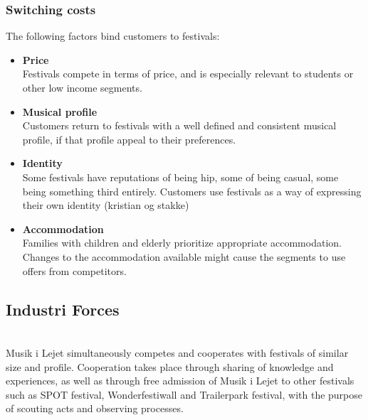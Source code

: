 \subsubsection{Switching costs}
The following factors bind customers to festivals:
\begin{itemize}
	\item \textbf{Price}\\
	Festivals compete in terms of price, and is especially relevant to students or other low income segments.
	\item \textbf{Musical profile}\\
	Customers return to festivals with a well defined and consistent musical profile, if that profile appeal to their preferences.
	\item \textbf{Identity}\\
	Some festivals have reputations of being hip, some of being casual, some being something third entirely. Customers use festivals as a way of expressing their own identity (kristian og stakke)
	\item \textbf{Accommodation}\\
	Families with children and elderly prioritize appropriate accommodation. Changes to the accommodation available might cause the segments to use offers from competitors.
\end{itemize}
\subsection{Industri Forces}
\\
Musik i Lejet simultaneously competes and cooperates with festivals of similar size and profile. Cooperation takes place through sharing of knowledge and experiences, as well as through free admission of Musik i Lejet to other festivals such as SPOT festival, Wonderfestiwall and Trailerpark festival, with the purpose of scouting acts and observing processes.

